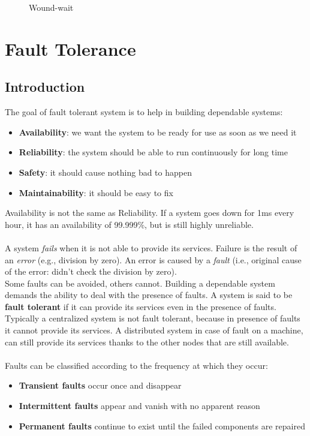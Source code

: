 \documentclass[10pt,a4paper]{article}
\begin{document}
\begin{figure}[h!]
\begin{minipage}{.4\textwidth}
  \label{fig:wound-wait}
  \caption{Wound-wait}
\end{minipage}
\end{figure} \pagebreak
\section{\LARGE Fault Tolerance}
\subsection{Introduction}
The goal of fault tolerant system is to help in building dependable systems:
\begin{itemize}
	\item \textbf{Availability}: we want the system to be ready for use as soon as we need it
	\item \textbf{Reliability}: the system should be able to run continuously for long time
	\item \textbf{Safety}: it should cause nothing bad to happen
	\item \textbf{Maintainability}: it should be easy to fix
\end{itemize}
Availability is not the same as Reliability. If a system goes down for 1ms every hour, it has an availability of 99.999\%, but is still highly unreliable. \\ \\
A system \textit{fails} when it is not able to provide its services. Failure is the result of an \textit{error} (e.g., division by zero). An error is caused by a \textit{fault} (i.e., original cause of the error: didn't check the division by zero). \\
Some faults can be avoided, others cannot. Building a dependable system demands the ability to deal with the presence of faults. A system is said to be \textbf{fault tolerant} if it can provide its services even in the presence of faults. Typically a centralized system is not fault tolerant, because in presence of faults it cannot provide its services. A distributed system in case of fault on a machine, can still provide its services thanks to the other nodes that are still available. \\ \\
Faults can be classified according to the frequency at which they occur:
\begin{itemize}
	\item \textbf{Transient faults} occur once and disappear
	\item \textbf{Intermittent faults} appear and vanish with no apparent reason
	\item \textbf{Permanent faults} continue to exist until the failed components are repaired
\end{itemize}
\end{document}
